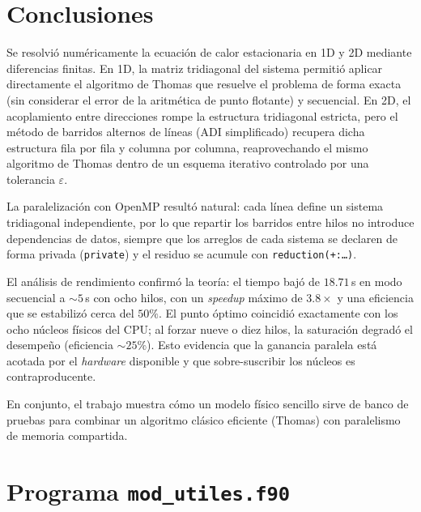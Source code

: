 \documentclass[12pt,twocolumn]{article}
\begin{document}
\section{Conclusiones}

Se resolvió numéricamente la ecuación de calor estacionaria en 1D y 2D
mediante diferencias finitas. En 1D, la matriz tridiagonal del sistema
permitió aplicar directamente el algoritmo de Thomas que resuelve
el problema de forma exacta (sin considerar el error de la aritmética de punto flotante) y secuencial. En 2D, el acoplamiento entre
direcciones rompe la estructura tridiagonal estricta, pero el método de
barridos alternos de líneas (ADI simplificado) recupera dicha estructura
fila por fila y columna por columna, reaprovechando el mismo algoritmo de
Thomas dentro de un esquema iterativo controlado por una tolerancia
$\varepsilon$.

La paralelización con OpenMP resultó natural: cada línea define un sistema
tridiagonal independiente, por lo que repartir los barridos entre hilos no
introduce dependencias de datos, siempre que los arreglos de cada sistema
se declaren de forma privada (\texttt{private}) y el residuo se acumule con
\texttt{reduction(+:\dots)}.

El análisis de rendimiento confirmó la teoría: el tiempo bajó de
$18.71$\,s en modo secuencial a $\sim5$\,s con ocho hilos, con un
\emph{speedup} máximo de $3.8\times$ y una eficiencia que se estabilizó
cerca del $50\%$. El punto óptimo coincidió exactamente con los ocho
núcleos físicos del CPU; al forzar nueve o diez hilos, la saturación
degradó el desempeño (eficiencia $\sim25\%$). Esto evidencia que la
ganancia paralela está acotada por el \emph{hardware} disponible y que
sobre-suscribir los núcleos es contraproducente.

En conjunto, el trabajo muestra cómo un modelo físico sencillo sirve de
banco de pruebas para combinar un algoritmo clásico eficiente (Thomas) con
paralelismo de memoria compartida.

\printbibliography

\appendix

\section{Programa \texorpdfstring{\texttt{mod\_utiles.f90}}{mod\_utiles.f90}}
\label{sec:apendiceA}
\inputminted{fortran}{mod_utiles.f90}
\end{document}

